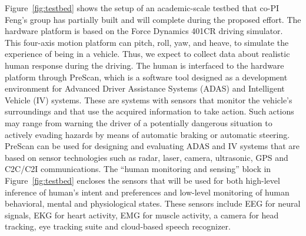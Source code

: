 Figure~\ref{fig:testbed} shows the setup of an academic-scale testbed that co-PI Feng's group has partially built and will complete during the proposed effort. The hardware platform is based on the Force Dynamics 401CR driving simulator. This four-axis motion platform can pitch, roll, yaw, and heave, to simulate the experience of being in a vehicle. Thus, we expect to collect data about realistic human response during the driving. The human is interfaced to the hardware platform through PreScan, which is a software tool designed as a development environment for Advanced Driver Assistance Systems (ADAS) and Intelligent Vehicle (IV) systems. These are systems with sensors that monitor the vehicle's surroundings and that use the acquired information to take action. Such actions may range from warning the driver of a potentially dangerous situation to actively evading hazards by means of automatic braking or automatic steering. PreScan can be used for designing and evaluating ADAS and IV systems that are based on sensor technologies such as radar, laser, camera, ultrasonic, GPS and C2C/C2I communications. 
The ``human monitoring and sensing'' block in Figure~\ref{fig:testbed} encloses the sensors that will be used for both high-level inference of human's intent and preferences and low-level monitoring of human behavioral, mental and physiological states. These sensors include EEG for neural signals, EKG for heart activity, EMG for muscle activity, a camera for head tracking, eye tracking suite and cloud-based speech recognizer.



